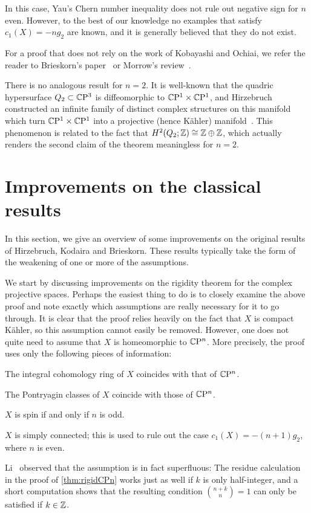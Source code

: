 \begin{rem}\leavevmode
	\begin{numberedlist}
		\item In this case, Yau's Chern number inequality does not rule out negative sign for $n$ even. However, to the best of our knowledge no examples that satisfy $c_1(X)=-ng_2$ are known, and it is generally believed that they do not exist.
		\item For a proof that does not rely on the work of Kobayashi and Ochiai, we refer the reader to Brieskorn's paper~\cite{Bri1964} or Morrow's review~\cite{Mor1969}.
		\item There is no analogous result for $n=2$. It is well-known that the quadric hypersurface $Q_2\subset \mathbb{C}\mathrm{P}^3$ is diffeomorphic to $\mathbb{C}\mathrm{P}^1\times \mathbb{C}\mathrm{P}^1$, and Hirzebruch constructed an infinite family of distinct complex structures on this manifold which turn $\mathbb{C}\mathrm{P}^1\times \mathbb{C}\mathrm{P}^1$ into a projective (hence K\"ahler) manifold~\cite{Hir1951}. This phenomenon is related to the fact that $H^2(Q_2;\mathbb{Z})\cong \mathbb{Z}\oplus\mathbb{Z}$, which actually renders the second claim of the theorem meaningless for $n=2$. 
	\end{numberedlist}
\end{rem}

\section{Improvements on the classical results}

In this section, we give an overview of some improvements on the original results of Hirzebruch, Kodaira and Brieskorn. These results typically take the form of the weakening of one or more of the assumptions.

We start by discussing improvements on the rigidity theorem for the complex projective spaces. Perhaps the easiest thing to do is to closely examine the above proof and note exactly which assumptions are really necessary for it to go through. It is clear that the proof relies heavily on the fact that $X$ is compact K\"ahler, so this assumption cannot easily be removed. However, one does not quite need to assume that $X$ is homeomorphic to $\mathbb{C}\mathrm{P}^n$. More precisely, the proof uses only the following pieces of information:
\begin{numberedlist}
	\item The integral cohomology ring of $X$ coincides with that of $\mathbb{C}\mathrm{P}^n$.
	\item The Pontryagin classes of $X$ coincide with those of $\mathbb{C}\mathrm{P}^n$.
	\item $X$ is spin if and only if $n$ is odd.
	\item $X$ is simply connected; this is used to rule out the case $c_1(X)=-(n+1)g_2$, where $n$ is even.
\end{numberedlist} 
Li~\cite{Li2016} observed that the assumption is in fact superfluous: The residue calculation in the proof of \cref{thm:rigidCPn} works just as well if $k$ is only half-integer, and a short computation shows that the resulting condition $\binom{n+k}{n}=1$ can only be satisfied if $k\in \mathbb{Z}$. 

